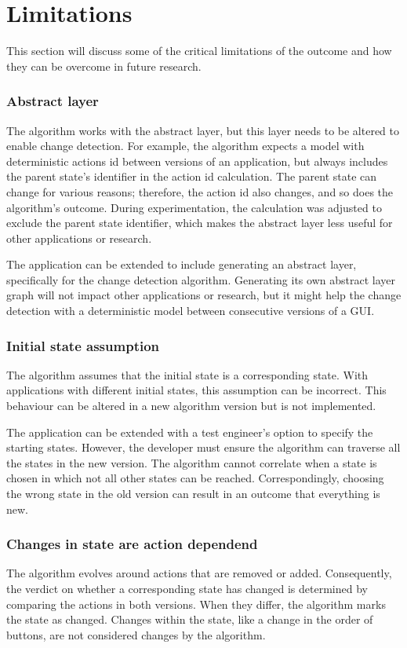 \section{Limitations}
This section will discuss some of the critical limitations of the outcome and how they can be overcome in future research. 

\subsubsection{Abstract layer}
The algorithm works with the abstract layer, but this layer needs to be altered to enable change detection. For example, the algorithm expects a model with deterministic actions id between versions of an application, but \testar always includes the parent state's identifier in the action id calculation. The parent state can change for various reasons; therefore, the action id also changes, and so does the algorithm's outcome. During experimentation, the calculation was adjusted to exclude the parent state identifier, which makes the abstract layer less useful for other applications or research.

The application can be extended to include generating an abstract layer, specifically for the change detection algorithm. Generating its own abstract layer graph will not impact other applications or research, but it might help the change detection with a deterministic model between consecutive versions of a GUI. 

\subsubsection{Initial state assumption}
The algorithm assumes that the initial state is a corresponding state. With applications with different initial states, this assumption can be incorrect. This behaviour can be altered in a new algorithm version but is not implemented. 

The application can be extended with a test engineer's option to specify the starting states. However, the developer must ensure the algorithm can traverse all the states in the new version. The algorithm cannot correlate when a state is chosen in which not all other states can be reached. Correspondingly, choosing the wrong state in the old version can result in an outcome that everything is new. 

\subsubsection{Changes in state are action dependend}
The algorithm evolves around actions that are removed or added. Consequently, the verdict on whether a corresponding state has changed is determined by comparing the actions in both versions. When they differ, the algorithm marks the state as changed. Changes within the state, like a change in the order of buttons, are not considered changes by the algorithm. 

